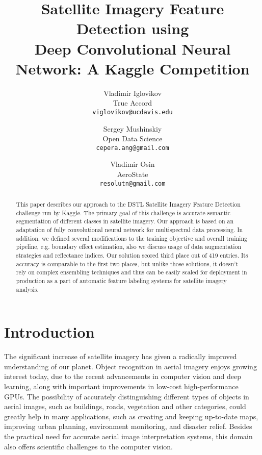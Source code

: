\documentclass[10pt,twocolumn,letterpaper]{article}
\begin{document}
\title{Satellite Imagery Feature Detection using \\ Deep Convolutional Neural Network: A Kaggle Competition}

\author{Vladimir Iglovikov\\
True Accord\\
{\tt\small viglovikov@ucdavis.edu}
\and
Sergey Mushinskiy\\
Open Data Science\\
{\tt\small cepera.ang@gmail.com}
\and
Vladimir Osin\\
AeroState\\
{\tt\small resolutn@gmail.com}
}

\maketitle

\begin{abstract}
This paper describes our approach to the DSTL Satellite Imagery Feature Detection challenge \cite{dstl_competition} run by Kaggle. The primary goal of this challenge is accurate semantic segmentation of different classes in satellite imagery. Our approach is based on an adaptation of fully convolutional neural network for multispectral data processing.  In addition, we defined several modifications to the training objective and overall training pipeline, e.g. boundary effect estimation, also we discuss usage of data augmentation strategies and reflectance indices. Our solution scored third place out of 419 entries. Its accuracy is comparable to the first two places, but unlike those solutions, it doesn't rely on complex ensembling techniques and thus can be easily scaled for deployment in production as a part of automatic feature labeling systems for satellite imagery analysis.
\end{abstract}

\section{Introduction}
The significant increase of satellite imagery has given a radically improved understanding of our planet. Object recognition in aerial imagery enjoys growing interest today, due to the recent advancements in computer vision and deep learning, along with important improvements in low-cost high-performance GPUs. The possibility of accurately distinguishing different types of objects in aerial images, such as buildings, roads, vegetation and other categories, could greatly help in many applications, such as creating and keeping up-to-date maps, improving urban planning, environment monitoring, and disaster relief. Besides the practical need for accurate aerial image interpretation systems, this domain also offers scientific challenges to the computer vision.
\end{document}
